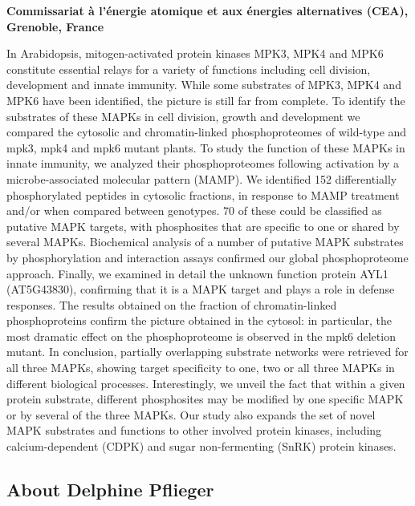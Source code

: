 \documentclass[12pt,]{book}
\theoremstyle{definition}
\theoremstyle{definition}
\theoremstyle{remark}
\begin{document}
\textbf{Commissariat à l'énergie atomique et aux énergies alternatives
(CEA), Grenoble, France}

In Arabidopsis, mitogen-activated protein kinases MPK3, MPK4 and MPK6
constitute essential relays for a variety of functions including cell
division, development and innate immunity. While some substrates of
MPK3, MPK4 and MPK6 have been identified, the picture is still far from
complete. To identify the substrates of these MAPKs in cell division,
growth and development we compared the cytosolic and chromatin-linked
phosphoproteomes of wild-type and mpk3, mpk4 and mpk6 mutant plants. To
study the function of these MAPKs in innate immunity, we analyzed their
phosphoproteomes following activation by a microbe-associated molecular
pattern (MAMP). We identified 152 differentially phosphorylated peptides
in cytosolic fractions, in response to MAMP treatment and/or when
compared between genotypes. 70 of these could be classified as putative
MAPK targets, with phosphosites that are specific to one or shared by
several MAPKs. Biochemical analysis of a number of putative MAPK
substrates by phosphorylation and interaction assays confirmed our
global phosphoproteome approach. Finally, we examined in detail the
unknown function protein AYL1 (AT5G43830), confirming that it is a MAPK
target and plays a role in defense responses. The results obtained on
the fraction of chromatin-linked phosphoproteins confirm the picture
obtained in the cytosol: in particular, the most dramatic effect on the
phosphoproteome is observed in the mpk6 deletion mutant. In conclusion,
partially overlapping substrate networks were retrieved for all three
MAPKs, showing target specificity to one, two or all three MAPKs in
different biological processes. Interestingly, we unveil the fact that
within a given protein substrate, different phosphosites may be modified
by one specific MAPK or by several of the three MAPKs. Our study also
expands the set of novel MAPK substrates and functions to other involved
protein kinases, including calcium-dependent (CDPK) and sugar
non-fermenting (SnRK) protein kinases.

\subsection*{About Delphine Pflieger}\label{about-delphine-pflieger}
\end{document}
